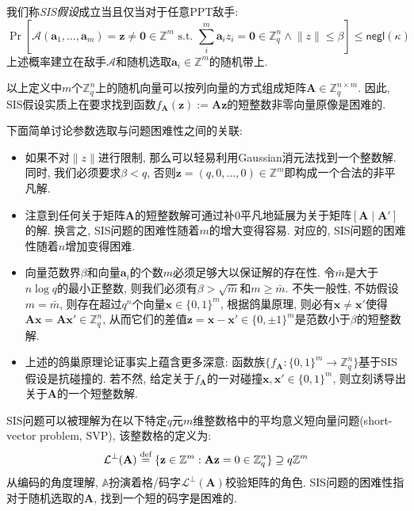 \begin{definition}
我们称\emph{SIS假设}成立当且仅当对于任意PPT敌手:
\begin{equation*}
\Pr[\mathcal{A}(\mathbf{a}_1, \dots, \mathbf{a}_m) = \mathbf{z} \neq \mathbf{0} \in \mathbb{Z}^m \text{~s.t.~} 
\sum_{i}^m \mathbf{a}_i z_i = \mathbf{0} \in \mathbb{Z}_q^n \wedge \lVert z \rVert \leq \beta] \leq \mathsf{negl}(\kappa) 
\end{equation*} 
上述概率建立在敌手$\mathcal{A}$和随机选取$\mathbf{a}_i \in \mathbb{Z}^m$的随机带上. 
\end{definition}
以上定义中$m$个$\mathbb{Z}_q^n$上的随机向量可以按列向量的方式组成矩阵$\mathbf{A} \in \mathbb{Z}_q^{n \times m}$. 
因此, SIS假设实质上在要求找到函数$f_\mathbf{A}(\mathbf{z}) := \mathbf{A} \mathbf{z}$的短整数非零向量原像是困难的. 

下面简单讨论参数选取与问题困难性之间的关联: 
\begin{itemize}
\item 如果不对$\lVert z \rVert$进行限制, 那么可以轻易利用Gaussian消元法找到一个整数解. 
	同时, 我们必须要求$\beta < q$, 否则$\mathbf{z} = (q, 0, \dots, 0) \in \mathbb{Z}^m$即构成一个合法的非平凡解. 

\item 注意到任何关于矩阵$\mathbf{A}$的短整数解可通过补$0$平凡地延展为关于矩阵$[\mathbf{A} \mid \mathbf{A}']$的解. 
	换言之, SIS问题的困难性随着$m$的增大变得容易. 对应的, SIS问题的困难性随着$n$增加变得困难. 

\item 向量范数界$\beta$和向量$\mathbf{a}_i$的个数$m$必须足够大以保证解的存在性. 
	令$\bar{m}$是大于$n \log q$的最小正整数, 则我们必须有$\beta > \sqrt{\bar{m}}$和$m \geq \bar{m}$. 
	不失一般性, 不妨假设$m = \bar{m}$, 则存在超过$q^n$个向量$\mathbf{x} \in \{0,1\}^m$, 
	根据鸽巢原理, 则必有$\mathbf{x} \neq \mathbf{x}'$使得$\mathbf{A}\mathbf{x} = \mathbf{A}\mathbf{x}' \in \mathbb{Z}_q^n$, 
	从而它们的差值$\mathbf{z} = \mathbf{x} - \mathbf{x}' \in \{0, \pm 1\}^m$是范数小于$\beta$的短整数解. 

\item 上述的鸽巢原理论证事实上蕴含更多深意: 函数族$\{f_\mathbf{A}: \{0,1\}^m \rightarrow \mathbb{Z}_q^n\}$基于SIS假设是抗碰撞的. 
	若不然, 给定关于$f_\mathbf{A}$的一对碰撞$\mathbf{x}, \mathbf{x}' \in \{0,1\}^m$, 则立刻诱导出关于$\mathbf{A}$的一个短整数解. 
\end{itemize}

SIS问题可以被理解为在以下特定$q$元$m$维整数格中的平均意义短向量问题(short-vector problem, SVP), 该整数格的定义为: 
\begin{equation*}
\mathcal{L}^{\bot}(\mathbf{A}) \stackrel{\textup{def}}{=} \{\mathbf{z} \in \mathbb{Z}^m: \mathbf{A}\mathbf{z} = 0 \in \mathbb{Z}_q^n\} 
\supseteq q\mathbb{Z}^m
\end{equation*}
从编码的角度理解, $\mathbb{A}$扮演着格/码字$\mathcal{L}^{\bot}(\mathbf{A})$校验矩阵的角色. 
SIS问题的困难性指对于随机选取的$\mathbf{A}$, 找到一个短的码字是困难的. 


